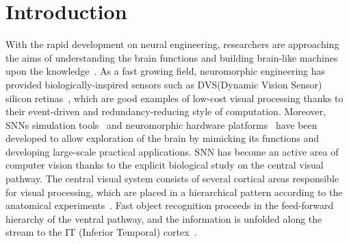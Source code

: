 \section{Introduction}
\label{sec:intro}
With the rapid development on neural engineering, researchers are approaching the aims of understanding the brain functions and building brain-like machines upon the knowledge~\cite{furber2007neural}. 
As a fast growing field, neuromorphic engineering has provided biologically-inspired sensors such as DVS(Dynamic Vision Sensor) silicon retinas~\cite{serrano-gotarredona_128_2013, lichtsteiner2008128}, which are good examples of low-cost visual processing thanks to their event-driven and redundancy-reducing style of computation.
Moreover, SNNs simulation tools~\cite{davison2008pynn, gewaltig2007nest, goodman2008brian} and neuromorphic hardware platforms~\cite{furber2013overview,  schemmel2010wafer, moradi2014event} have been developed to allow exploration of the brain by mimicking its functions and developing large-scale practical applications.
SNN has become an active area of computer vision thanks to the explicit  biological study on the central visual pathway.
The central visual system consists of several cortical areas responsible for visual processing, which are placed in a hierarchical pattern according to the anatomical experiments~\cite{felleman1991distributed}.
Fast object recognition proceeds in  the feed-forward hierarchy of the ventral pathway, and the information is unfolded along the stream to the  IT (Inferior Temporal) cortex~\cite{dicarlo2012does}.

